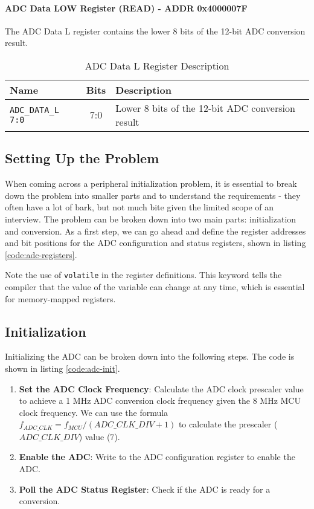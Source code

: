 \documentclass[main.tex]{subfiles}
\begin{document}
\paragraph{ADC Data LOW Register (READ) - ADDR 0x4000007F}
The ADC Data L register contains the lower 8 bits of the 12-bit ADC conversion result.
\begin{table}[H]
    \centering
    \begin{tabular}{|l|c|p{10cm}|}
        \hline
        \textbf{Name} & \textbf{Bits} & \textbf{Description} \\ \hline
        \texttt{ADC\_DATA\_L 7:0} & 7:0 & Lower 8 bits of the 12-bit ADC conversion result \\ \hline
    \end{tabular}
    \caption{ADC Data L Register Description}
    \label{tab:adc_data_l_register}
\end{table}

\spoilerline

\subsection{Setting Up the Problem}
When coming across a peripheral initialization problem, it is essential to break down the problem into smaller parts and to understand the requirements - they often have a lot of bark, but not much bite given the limited scope of an interview. The problem can be broken down into two main parts: initialization and conversion. As a first step, we can go ahead and define the register addresses and bit positions for the ADC configuration and status registers, shown in listing \ref{code:adc-registers}.


\noindent Note the use of \texttt{volatile} in the register definitions. This keyword tells the compiler that the value of the variable can change at any time, which is essential for memory-mapped registers.

\subsection {Initialization} 
Initializing the ADC can be broken down into the following steps. The code is shown in listing \ref{code:adc-init}.
\begin{enumerate}
    \item \textbf{Set the ADC Clock Frequency}: Calculate the ADC clock prescaler value to achieve a 1 MHz ADC conversion clock frequency given the 8 MHz MCU clock frequency. We can use the formula $f_{ADC\_CLK} = f_{MCU}/(ADC\_CLK\_DIV + 1)$ to calculate the prescaler ($ADC\_CLK\_DIV$) value (7).
    \item \textbf{Enable the ADC}: Write to the ADC configuration register to enable the ADC.
    \item \textbf{Poll the ADC Status Register}: Check if the ADC is ready for a conversion.
\end{enumerate}
\end{document}
